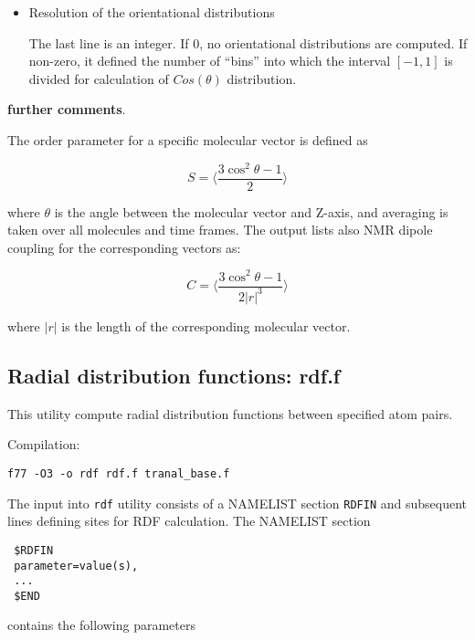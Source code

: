 \documentclass{article}
\begin{document}
\begin{itemize}
\item
Resolution of the orientational distributions

The last line is an integer. If 0, no orientational distributions are 
computed. If non-zero, it defined the number of ``bins'' into which
the interval $[-1,1]$ is divided for calculation of $Cos(\theta)$
distribution.
 
\end{itemize}

{\bf further comments}.

The order parameter for a specific molecular vector is defined as

$$S = \langle \frac{3\cos^2\theta - 1}{2}\rangle$$

where $\theta$ is the angle between the molecular vector and Z-axis, and 
averaging is taken over all molecules and time frames.
The output lists also NMR dipole coupling for the corresponding vectors as:

$$C = \langle \frac{3\cos^2\theta - 1}{2|r|^3}\rangle$$
  
where $|r|$ is the length of the corresponding molecular vector.

\subsection{Radial distribution functions: rdf.f}

This utility compute radial distribution functions between specified 
atom pairs.

Compilation:

\verb|f77 -O3 -o rdf rdf.f tranal_base.f|

The input into \verb|rdf| utility consists of a NAMELIST section
\verb|RDFIN| and subsequent lines defining sites for RDF calculation.
The NAMELIST section

\begin{verbatim}
 $RDFIN
 parameter=value(s),
 ...
 $END
\end{verbatim}

contains the following parameters
\end{document}
